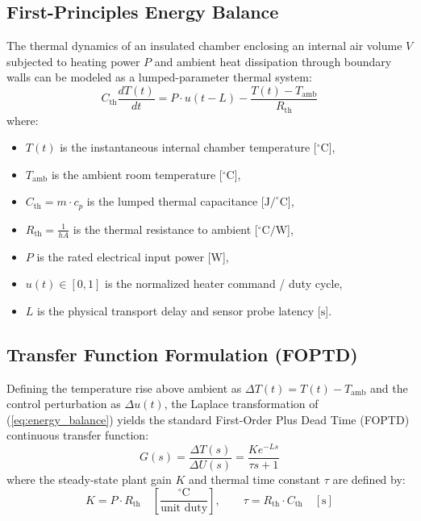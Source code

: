 \documentclass[conference]{IEEEtran}
\begin{document}
\subsection{First-Principles Energy Balance}
The thermal dynamics of an insulated chamber enclosing an internal air volume $V$ subjected to heating power $P$ and ambient heat dissipation through boundary walls can be modeled as a lumped-parameter thermal system:
\begin{equation}
C_\text{th} \frac{dT(t)}{dt} = P \cdot u(t - L) - \frac{T(t) - T_\text{amb}}{R_\text{th}}
\label{eq:energy_balance}
\end{equation}
where:
\begin{itemize}
    \item $T(t)$ is the instantaneous internal chamber temperature [$^\circ\text{C}$],
    \item $T_\text{amb}$ is the ambient room temperature [$^\circ\text{C}$],
    \item $C_\text{th} = m \cdot c_p$ is the lumped thermal capacitance [$\text{J/}^\circ\text{C}$],
    \item $R_\text{th} = \frac{1}{h A}$ is the thermal resistance to ambient [$\text{}^\circ\text{C/W}$],
    \item $P$ is the rated electrical input power [$\text{W}$],
    \item $u(t) \in [0, 1]$ is the normalized heater command / duty cycle,
    \item $L$ is the physical transport delay and sensor probe latency [$\text{s}$].
\end{itemize}

\subsection{Transfer Function Formulation (FOPTD)}
Defining the temperature rise above ambient as $\Delta T(t) = T(t) - T_\text{amb}$ and the control perturbation as $\Delta u(t)$, the Laplace transformation of (\ref{eq:energy_balance}) yields the standard First-Order Plus Dead Time (FOPTD) continuous transfer function:
\begin{equation}
G(s) = \frac{\Delta T(s)}{\Delta U(s)} = \frac{K e^{-Ls}}{\tau s + 1}
\label{eq:foptd}
\end{equation}
where the steady-state plant gain $K$ and thermal time constant $\tau$ are defined by:
\begin{equation}
K = P \cdot R_\text{th} \quad \left[\frac{^\circ\text{C}}{\text{unit duty}}\right], \qquad \tau = R_\text{th} \cdot C_\text{th} \quad [\text{s}]
\end{equation}
\end{document}
